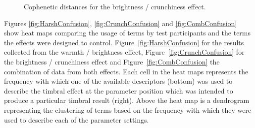 			\begin{figure}[h!]
				\centering
				\quad
				\caption{Cophenetic distances for the brightness / crunchiness effect.}
				\label{fig:CrunchCophs}
			\end{figure}

			Figures \ref{fig:HarshConfusion}, \ref{fig:CrunchConfusion} and \ref{fig:CombConfusion} show heat
			maps comparing the usage of terms by test participants and the terms the effects were designed to
			control. Figure~\ref{fig:HarshConfusion} for the results collected from the warmth / brightness
			effect, Figure~\ref{fig:CrunchConfusion} for the brightness / crunchiness effect and
			Figure~\ref{fig:CombConfusion} the combination of data from both effects. Each cell in the heat
			maps represents the frequency with which one of the available descriptors (bottom) was used to
			describe the timbral effect at the parameter position which was intended to produce a particular
			timbral result (right). Above the heat map is a dendrogram representing the clustering of terms
			based on the frequency with which they were used to describe each of the parameter settings.


